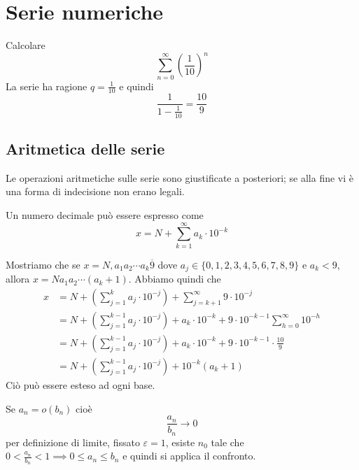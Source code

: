 \documentclass[a4paper]{article}
\begin{document}
\section{Serie numeriche}


\begin{snippetexample}{}
    Calcolare
    \[
        \sum_{n=0}^\infty {\left(\frac{1}{10}\right)}^n
    \]
    La serie ha ragione \(q = \frac{1}{10}\)
    e quindi
    \[
        \frac{1}{1 - \frac{1}{10}} = \frac{10}{9}
    \]
\end{snippetexample}

\subsection{Aritmetica delle serie}

Le operazioni aritmetiche sulle serie sono giustificate a posteriori;
se alla fine vi è una forma di indecisione non erano legali.

\begin{snippetproposition}{}
    Un numero decimale può essere espresso come
    \[
        x = N + \sum_{k=1}^\infty a_k \cdot 10^{-k}
    \]
\end{snippetproposition}

\begin{snippetexample}{}
    Mostriamo che se
    \(x = N, a_1 a_2 \cdots a_k \overline{9}\) dove \(a_j \in \{0,1,2,3,4,5,6,7,8,9\}\)
    e \(a_k < 9\),
    allora \(x = N a_1 a_2 \cdots (a_k + 1)\).
    Abbiamo quindi che
    \begin{align*}
        x &= N + \left( \sum_{j=1}^k a_j \cdot 10^{-j} \right)
        + \sum_{j=k+1}^\infty 9 \cdot 10^{-j} \\
        &= N + \left( \sum_{j=1}^{k-1} a_j \cdot 10^{-j} \right)
        + a_k \cdot 10^{-k} + 9\cdot 10^{-k-1}
        \sum_{h=0}^\infty 10^{-h} \\
        &= N + \left( \sum_{j=1}^{k-1} a_j \cdot 10^{-j} \right)
        + a_k \cdot 10^{-k} + 9 \cdot 10^{-k-1} \cdot \frac{10}{9} \\
        &= N + \left( \sum_{j=1}^{k-1} a_j \cdot 10^{-j}\right) + 10^{-k}(a_k + 1)
    \end{align*}
    Ciò può essere esteso ad ogni base.
\end{snippetexample}

\begin{snippetcorollary}{}
    Se \(a_n = o(b_n)\) cioè
    \[
        \frac{a_n}{b_n} \to 0
    \]
    per definizione di limite, fissato \(\varepsilon = 1\),
    esiste \(n_0\) tale che \(0 < \frac{a_n}{b_n} < 1 \implies 0 \leq a_n \leq b_n\)
    e quindi si applica il confronto.
\end{snippetcorollary}
\end{document}
